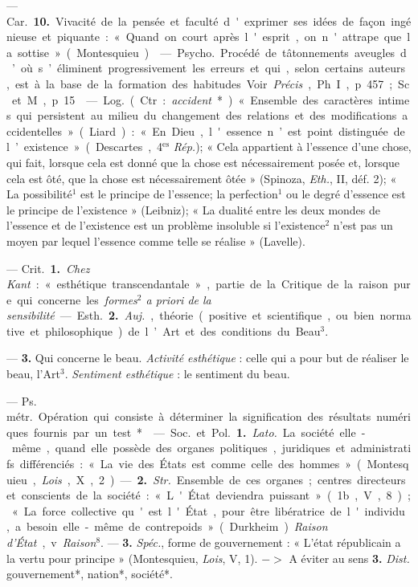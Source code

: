 \begin{itemize}[leftmargin=1cm, label=, itemsep=1pt]
— \si{Car.} {\bf 10.} Vivacité de la pensée
et faculté d'exprimer ses idées de
façon ingénieuse et piquante :
« Quand on court après l'esprit, on
n'attrape que la sottise » (Montesquieu).

 — \si{Psycho.} Procédé
de tâtonnements aveugles d’où s’éliminent progressivement les erreurs
et qui, selon certains auteurs, est à
la base de la formation des habitudes. Voir  {\it Précis}, Ph. I, p. 457; Sc.
et M., p. 15.

 — \si{Log.} (Ctr. : {\it accident}*).
« Ensemble des caractères intimes
qui persistent au milieu du changement des relations et des
modifications accidentelles » (Liard) : « En
Dieu, l'essence n’est point distinguée
de l’existence » (Descartes, 4$^\text{es}$ {\it Rép.});
« Cela appartient à l’essence d’une
chose, qui fait, lorsque cela est donné
que la chose est nécessairement
posée et, lorsque cela est ôté, que la
chose est nécessairement ôtée »
(Spinoza, {\it Eth.}, II, déf. 2); « La
possibilité$^1$ est le principe de l’essence; la perfection$^1$ ou le degré
d'essence est le principe de l'existence » (Leibniz); « La dualité entre
les deux mondes de l'essence et de
l'existence est un problème insoluble si l'existence$^2$ n’est pas un
moyen par lequel l'essence comme
telle se réalise » (Lavelle).

 — \si{Crit.} {\bf 1.} {\it Chez
Kant} : « esthétique transcendantale », partie de la Critique de la
raison pure qui concerne les {\it formes$^2$
a priori de la sensibilité}.

— \si{Esth.} {\bf 2.} {\it Auj.}, théorie (positive et scientifique, ou bien normative et philosophique) de l’Art et
des conditions du Beau$^3$.

 — {\bf 3.} Qui concerne
le beau. {\it Activité esthétique} : celle qui
a pour but de réaliser le beau, l’Art$^3$.
{\it Sentiment esthétique} : le sentiment du beau.

 — \si{Ps. métr.} Opération
qui consiste à déterminer la signification des résultats numériques
fournis par un test*.

 — \si{Soc.} et \si{Pol.} {\bf 1.} {\it Lato.} La société
elle-même, quand elle possède des
organes politiques, juridiques et
administratifs différenciés : « La vie
des États est comme celle des hommes » (Montesquieu, {\it Lois}, X, 2). —
 {\bf 2.} {\it Str.} Ensemble de ces organes;
centres directeurs et conscients de
la société : « L'État deviendra puissant »
(1b., V, 8); « La force collective qu'est l'État, pour être libératrice
de l'individu, a besoin elle-même de contrepoids » (Durkheim).
{\it Raison d'État}, v. {\it Raison}$^8$. — {\bf 3.}
{\it Spéc.}, forme de gouvernement :
« L'état républicain a la vertu pour
principe » (Montesquieu, {\it Lois}, V, 1).
$->$ A éviter au sens {\bf 3.} {\it Dist.} gouvernement*, nation*, société*.


\end{itemize}
